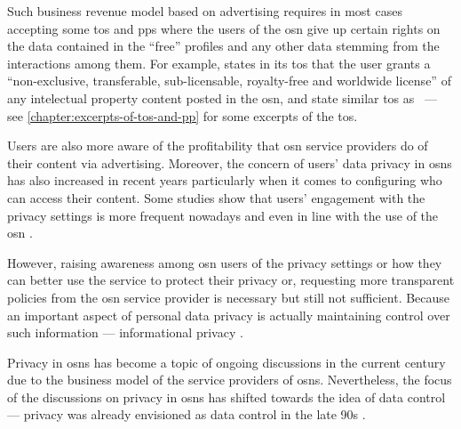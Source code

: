\documentclass[showtrims,oldfontcommands]{kthesis}
\begin{document}
Such business revenue model based on advertising requires in most cases accepting 
some \ac{tos} and \acp{pp} where the users of the \ac{osn} give up certain rights 
on the data contained in the ``free'' profiles and any other data stemming from 
the interactions among them. For example, \Facebook states in its \ac{tos} that 
the user grants a ``non-exclusive, transferable, sub-licensable, royalty-free and 
worldwide license'' of any intelectual property content posted in the \ac{osn}, 
\LinkedIn and \Twitter state similar \ac{tos} as \Facebook~--- see \cref{chapter:excerpts-of-tos-and-pp} 
for some excerpts of the \ac{tos}.

Users are also more aware of the profitability that \ac{osn} service providers do 
of their content via advertising. Moreover, the concern of users' data privacy in 
\acp{osn} has also increased in recent years particularly when it comes to configuring 
who can access their content. Some studies show that users' engagement with the 
privacy settings is more frequent nowadays and even in line with the use of the 
\ac{osn} \cite{boydH10}.

However, raising awareness among \ac{osn} users of the privacy settings or how they 
can better use the service to protect their privacy or, requesting more transparent 
policies from the \ac{osn} service provider is necessary but still not sufficient. 
Because an important aspect of personal data privacy is actually maintaining control 
over such information --- informational privacy \cite{Cavoukian96}.

Privacy in \acp{osn} has become a topic of ongoing discussions in the current century 
due to the business model of the service providers of \acp{osn}. Nevertheless, the 
focus of the discussions on privacy in \acp{osn} has shifted towards the idea of 
data control --- privacy was already envisioned as data control in the late 90s 
\cite{Allen99}.
\end{document}
